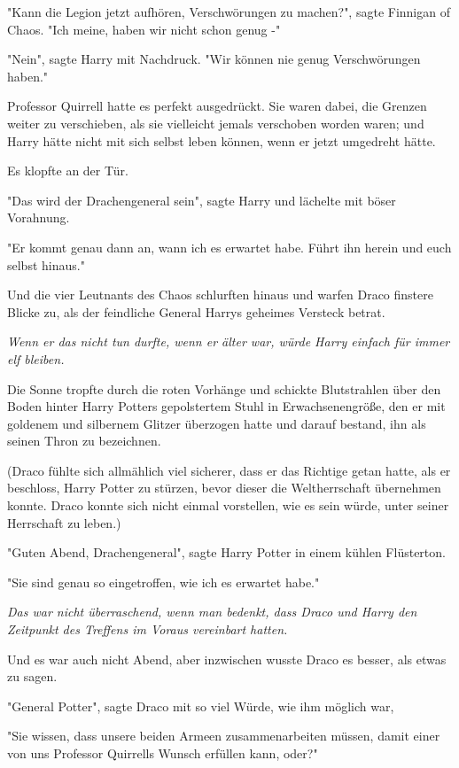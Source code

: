 {"Kann die Legion jetzt aufhören, Verschwörungen zu machen?", sagte Finnigan of Chaos. "Ich meine, haben wir nicht schon genug -"

"Nein", sagte Harry mit Nachdruck. "Wir können nie genug Verschwörungen haben."

Professor Quirrell hatte es perfekt ausgedrückt. Sie waren dabei, die Grenzen weiter zu verschieben, als sie vielleicht jemals verschoben worden waren; und Harry hätte nicht mit sich selbst leben können, wenn er jetzt umgedreht hätte.

Es klopfte an der Tür.

"Das wird der Drachengeneral sein", sagte Harry und lächelte mit böser Vorahnung.

"Er kommt genau dann an, wann ich es erwartet habe. Führt ihn herein und euch selbst hinaus."

Und die vier Leutnants des Chaos schlurften hinaus und warfen Draco finstere Blicke zu, als der feindliche General Harrys geheimes Versteck betrat.

\emph{Wenn er das nicht tun durfte, wenn er älter war, würde Harry einfach für immer elf bleiben.}

Die Sonne tropfte durch die roten Vorhänge und schickte Blutstrahlen über den Boden hinter Harry Potters gepolstertem Stuhl in Erwachsenengröße, den er mit goldenem und silbernem Glitzer überzogen hatte und darauf bestand, ihn als seinen Thron zu bezeichnen.

(Draco fühlte sich allmählich viel sicherer, dass er das Richtige getan hatte, als er beschloss, Harry Potter zu stürzen, bevor dieser die Weltherrschaft übernehmen konnte. Draco konnte sich nicht einmal vorstellen, wie es sein würde, unter seiner Herrschaft zu leben.)

"Guten Abend, Drachengeneral", sagte Harry Potter in einem kühlen Flüsterton.

"Sie sind genau so eingetroffen, wie ich es erwartet habe."

\emph{Das war nicht überraschend, wenn man bedenkt, dass Draco und Harry den Zeitpunkt des Treffens im Voraus vereinbart hatten.}

Und es war auch nicht Abend, aber inzwischen wusste Draco es besser, als etwas zu sagen.

"General Potter", sagte Draco mit so viel Würde, wie ihm möglich war,

"Sie wissen, dass unsere beiden Armeen zusammenarbeiten müssen, damit einer von uns Professor Quirrells Wunsch erfüllen kann, oder?"

}
